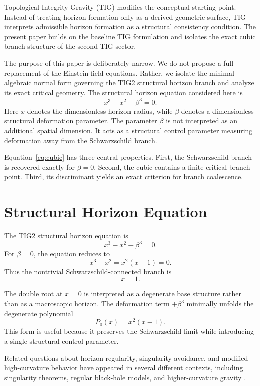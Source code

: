 \documentclass[12pt,a4paper]{article}
\begin{document}
Topological Integrity Gravity (TIG) modifies the conceptual starting point. Instead of treating horizon formation only as a derived geometric surface, TIG interprets admissible horizon formation as a structural consistency condition. The present paper builds on the baseline TIG formulation \cite{dietrich2026tig} and isolates the exact cubic branch structure of the second TIG sector.

The purpose of this paper is deliberately narrow. We do not propose a full replacement of the Einstein field equations. Rather, we isolate the minimal algebraic normal form governing the TIG2 structural horizon branch and analyze its exact critical geometry. The structural horizon equation considered here is
\begin{equation}
x^3-x^2+\beta^3=0.
\label{eq:cubic}
\end{equation}
Here \(x\) denotes the dimensionless horizon radius, while \(\beta\) denotes a dimensionless structural deformation parameter. The parameter \(\beta\) is not interpreted as an additional spatial dimension. It acts as a structural control parameter measuring deformation away from the Schwarzschild branch.

Equation~\eqref{eq:cubic} has three central properties. First, the Schwarzschild branch is recovered exactly for \(\beta=0\). Second, the cubic contains a finite critical branch point. Third, its discriminant yields an exact criterion for branch coalescence.

\section{Structural Horizon Equation}

The TIG2 structural horizon equation is
\begin{equation}
x^3-x^2+\beta^3=0.
\label{eq:maincubic}
\end{equation}
For \(\beta=0\), the equation reduces to
\[
x^3-x^2=x^2(x-1)=0.
\]
Thus the nontrivial Schwarzschild-connected branch is
\[
x=1.
\]

The double root at \(x=0\) is interpreted as a degenerate base structure rather than as a macroscopic horizon. The deformation term \(+\beta^3\) minimally unfolds the degenerate polynomial
\[
P_0(x)=x^2(x-1).
\]
This form is useful because it preserves the Schwarzschild limit while introducing a single structural control parameter.

Related questions about horizon regularity, singularity avoidance, and modified high-curvature behavior have appeared in several different contexts, including singularity theorems, regular black-hole models, and higher-curvature gravity \cite{penrose1965,bardeen1968,starobinsky1980,dymnikova1992,hayward2006}.
\end{document}
